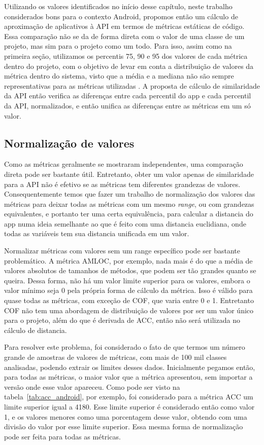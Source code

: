 Utilizando os valores identificados no início desse capítulo, neste trabalho considerados bons para o contexto Android, propomos então um cálculo de aproximação de aplicativos à API em termos de métricas estáticas de código. Essa comparação não se da de forma direta com o valor de uma classe de um projeto, mas sim para o projeto como um todo. Para isso, assim como na primeira seção, utilizamos os percentis 75, 90 e 95 dos valores de cada métrica dentro do projeto, com o objetivo de levar em conta a distribuição de valores da métrica dentro do sistema, visto que a média e a mediana não são sempre representativas para as métricas utilizadas \cite{meirelles2013}. A proposta de cálculo de similaridade da API então verifica as diferenças entre cada percentil do app e cada percentil da API, normalizados, e então unifica as diferenças entre as métricas em um só valor. 

\subsection{Normalização de valores}

Como as métricas geralmente se mostraram independentes, uma comparação direta pode ser bastante útil. Entretanto, obter um valor apenas de similaridade para a API não é efetivo se as métricas tem diferentes grandezas de valores. Consequentemente temos que fazer um trabalho de normalização dos valores das métricas para deixar todas as métricas com um mesmo \textit{range}, ou com grandezas equivalentes, e portanto ter uma certa equivalência, para calcular a distancia do app numa ideia semelhante ao que é feito com uma distancia euclidiana, onde todas as variáveis tem sua distancia unificada em um valor.

Normalizar métricas com valores sem um range específico pode ser bastante problemático. A métrica AMLOC, por exemplo, nada mais é do que a média de valores absolutos de tamanhos de métodos, que podem ser tão grandes quanto se queira. Dessa forma, não há um valor limite superior para os valores, embora o valor mínimo seja 0 pela própria forma de cálculo da métrica. Isso é válido para quase todas as métricas, com exceção de COF, que varia entre 0 e 1. Entretanto COF não tem uma abordagem de distribuição de valores por ser um valor único para o projeto, além do que é derivada de ACC, então não será utilizada no cálculo de distancia.

Para resolver este problema, foi considerado o fato de que termos um número grande de amostras de valores de métricas, com mais de 100 mil classes analisadas, podendo extrair os limites desses dados. Inicialmente pegamos então, para todas as métricas, o maior valor que a métrica apresentou, sem importar a versão onde esse valor apareceu. Como pode ser visto na tabela~\ref{tab:acc_android}, por exemplo, foi considerado para a métrica ACC um limite superior igual a 4180. Esse limite superior é considerado então como valor 1, e os valores menores como uma porcentagem desse valor, obtendo com uma divisão do valor por esse limite superior. Essa mesma forma de normalização pode ser feita para todas as métricas. 

